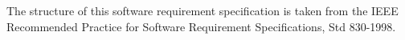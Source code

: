 
The structure of this software requirement specification is taken from the IEEE
Recommended Practice for Software Requirement Specifications, Std 830-1998.
